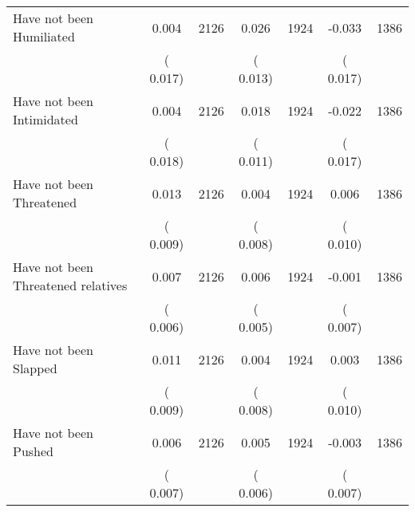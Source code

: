 \begin{tabular}{l*{6}{c}}
Have not been Humiliated        &              0.004      &       2126       &              0.026      &       1924       &             -0.033      &       1386       \\
                       &       (       0.017)            &                               &       (       0.013)            &                               &       (       0.017)            &                               \\
Have not been Intimidated        &              0.004      &       2126       &              0.018      &       1924       &             -0.022      &       1386       \\
                       &       (       0.018)            &                               &       (       0.011)            &                               &       (       0.017)            &                               \\
Have not been Threatened        &              0.013      &       2126       &              0.004      &       1924       &              0.006      &       1386       \\
                       &       (       0.009)            &                               &       (       0.008)            &                               &       (       0.010)            &                               \\
Have not been Threatened relatives        &              0.007      &       2126       &              0.006      &       1924       &             -0.001      &       1386       \\
                       &       (       0.006)            &                               &       (       0.005)            &                               &       (       0.007)            &                               \\
Have not been Slapped        &              0.011      &       2126       &              0.004      &       1924       &              0.003      &       1386       \\
                       &       (       0.009)            &                               &       (       0.008)            &                               &       (       0.010)            &                               \\
Have not been Pushed        &              0.006      &       2126       &              0.005      &       1924       &             -0.003      &       1386       \\
                       &       (       0.007)            &                               &       (       0.006)            &                               &       (       0.007)            &                               \\

\end{tabular}
